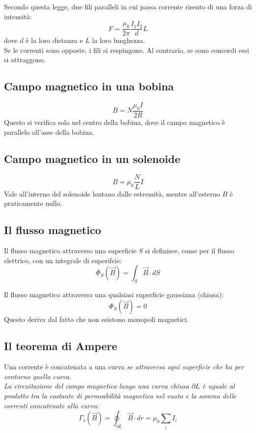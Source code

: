 \documentclass[12pt]{article}
\begin{document}
\vspace{1em}

Secondo questa legge, due fili paralleli in cui passa corrente risento di una forza di intensità:
$$ F = \frac{\mu_0}{2\pi}\frac{I_1I_2}{d}L $$
dove $d$ è la loro distanza e $L$ la loro lunghezza. \\
Se le correnti sono opposte, i fili si respingono. Al contrario, se sono concordi essi si attraggono.

\subsection{Campo magnetico in una bobina}
$$ B = N \frac{\mu_0I}{2R} $$
Questo si verifica solo nel centro della bobina, dove il campo magnetico è parallelo all'asse della bobina.

\subsection{Campo magnetico in un solenoide}
$$ B = \mu_0 \frac{N}{L} I $$
Vale all'interno del solenoide lontano dalle estremità, mentre all'esterno $B$ è praticamente nullo.

\subsection{Il flusso magnetico}
Il flusso magnetico attraverso una superficie $S$ si definisce, come per il flusso elettrico, con un integrale di superifcie:
$$ \Phi_S(\vec{B}) = \int_S \vec{B} \cdot dS $$

Il flusso magnetico attraverso una qualsiasi superficie gaussiana (chiusa):
$$ \Phi_S(\vec{B}) = 0 $$
Questo deriva dal fatto che non esistono monopoli magnetici.

\subsection{Il teorema di Ampere}
Una corrente è concatenata a una curva \textit{se attraversa ogni superficie che ha per contorno quella curva.} \\
\textit{La circuitazione del campo magnetico lungo una curva chiusa $\partial L$ è uguale al prodotto tra la costante di permeabilità magnetica nel vuoto e la somma delle correnti concatenate alla curva:}
$$ \Gamma_s(\vec{B}) = \oint_{\partial L} \vec{B} \cdot dr = \mu_0\sum_i I_i $$
\end{document}
